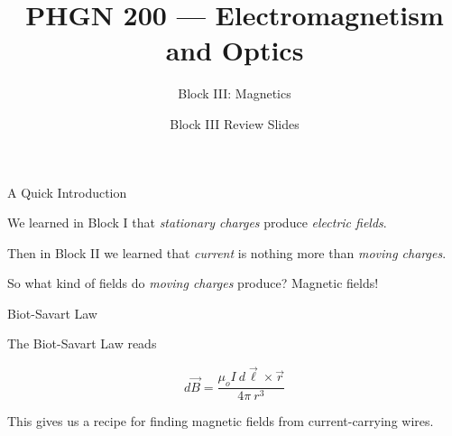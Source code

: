 \documentclass{beamer}
\title{PHGN 200 --- Electromagnetism and Optics}
\subtitle{Block III: Magnetics}
\author{}
\date{Block III Review Slides}
\begin{document}
\frame{\titlepage}

\begin{frame}{A Quick Introduction}

\begin{center}
    We learned in Block I that \emph{stationary charges} produce \emph{electric fields}.
\end{center}

\vfill

\begin{center}
    Then in Block II we learned that \emph{current} is nothing more than \emph{moving charges}.
\end{center}

\vfill

\begin{center}
    So what kind of fields do \emph{moving charges} produce? Magnetic fields!
\end{center}

\end{frame}

\begin{frame}{Biot-Savart Law}

The Biot-Savart Law reads

\begin{equation*}
    d\vec{B} = \frac{\mu_o I\ d\vec{\ell} \times \vec{r}}{4\pi\ r^3}
\end{equation*}

\vfill

\begin{center}
This gives us a recipe for finding magnetic fields from current-carrying wires.
\end{center}

\end{frame}
\end{document}
